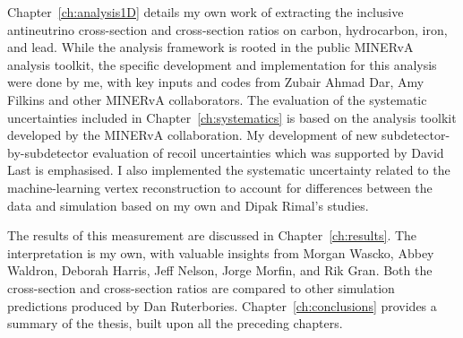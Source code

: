 \begin{declaration}
Chapter~\ref{ch:analysis1D} details my own work of extracting the inclusive antineutrino cross-section and cross-section ratios on carbon, hydrocarbon, iron, and lead. While the analysis framework is rooted in the public MINERvA analysis toolkit, the specific development and implementation for this analysis were done by me, with key inputs and codes from Zubair Ahmad Dar, Amy Filkins and other MINERvA collaborators. The evaluation of the systematic uncertainties included in Chapter~\ref{ch:systematics} is based on the analysis toolkit developed by the MINERvA collaboration. My development of new subdetector-by-subdetector evaluation of recoil uncertainties which was supported by David Last is emphasised. I also implemented the systematic uncertainty related to the machine-learning vertex reconstruction to account for differences between the data and simulation based on my own and Dipak Rimal's studies. 

The results of this measurement are discussed in Chapter~\ref{ch:results}. The interpretation is my own, with valuable insights from Morgan Wascko, Abbey Waldron, Deborah Harris, Jeff Nelson, Jorge Morfin, and Rik Gran. Both the cross-section and cross-section ratios are compared to other simulation predictions produced by Dan Ruterbories. Chapter~\ref{ch:conclusions} provides a summary of the thesis, built upon all the preceding chapters.


\end{declaration}